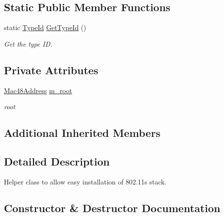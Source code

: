 \subsection*{Static Public Member Functions}
\begin{DoxyCompactItemize}
\item 
static \hyperlink{classns3_1_1TypeId}{Type\+Id} \hyperlink{classns3_1_1Dot11sStack_a0feffdc5c1855616ad66f3d055821b7c}{Get\+Type\+Id} ()
\begin{DoxyCompactList}\small\item\em Get the type ID. \end{DoxyCompactList}\end{DoxyCompactItemize}
\subsection*{Private Attributes}
\begin{DoxyCompactItemize}
\item 
\hyperlink{classns3_1_1Mac48Address}{Mac48\+Address} \hyperlink{classns3_1_1Dot11sStack_afc4a1c662a6d2c0a62672924f49b2a0c}{m\+\_\+root}
\begin{DoxyCompactList}\small\item\em root \end{DoxyCompactList}\end{DoxyCompactItemize}
\subsection*{Additional Inherited Members}


\subsection{Detailed Description}
Helper class to allow easy installation of 802.\+11s stack. 

\subsection{Constructor \& Destructor Documentation}
